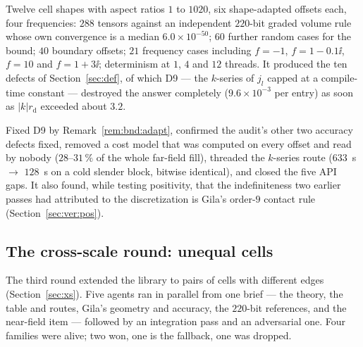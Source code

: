 \begin{description}[leftmargin=1.4em]
\item[The adversarial audit.] Twelve cell shapes with aspect ratios $1$ to $1020$, six
shape-adapted offsets each, four frequencies: $288$ tensors against an independent $220$-bit
graded volume rule whose own convergence is a median $6.0\times10^{-50}$; $60$ further
random cases for the bound; $40$ boundary offsets; $21$ frequency cases including $f = -1$,
$f = 1-0.1\ii$, $f = 10$ and $f = 1+3\ii$; determinism at $1$, $4$ and $12$ threads. It
produced the ten defects of Section~\ref{sec:def}, of which D9 --- the $k$-series of $j_l$
capped at a compile-time constant --- destroyed the answer completely
($9.6\times10^{-3}$ per entry) as soon as $|k| r_{\mathrm{d}}$ exceeded about $3.2$.

\item[The merge.] Fixed D9 by Remark~\ref{rem:bnd:adapt}, confirmed the audit's other two
accuracy defects fixed, removed a cost model that was computed on every offset and read by
nobody ($28$--$31\,\%$ of the whole far-field fill), threaded the $k$-series route
($633$~s $\to$ $128$~s on a cold slender block, bitwise identical), and closed the five API
gaps. It also found, while testing positivity, that the indefiniteness two earlier passes
had attributed to the discretization is Gila's order-$9$ contact rule
(Section~\ref{sec:ver:pos}).
\end{description}

\subsection{The cross-scale round: unequal cells}
\label{sec:reg:x}

The third round extended the library to pairs of cells with different edges
(Section~\ref{sec:xs}). Five agents ran in parallel from one brief --- the theory, the
table and routes, Gila's geometry and accuracy, the $220$-bit references, and the
near-field item --- followed by an integration pass and an adversarial one. Four families
were alive; two won, one is the fallback, one was dropped.

